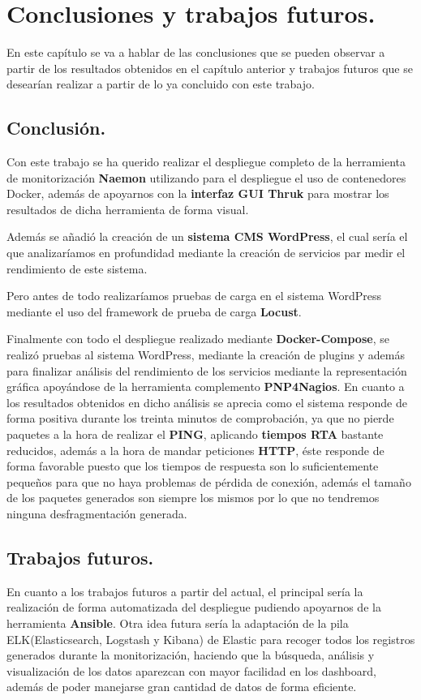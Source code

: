 \chapter{Conclusiones y trabajos futuros.} \label{ch:conclusion}

En este capítulo se va a hablar de las conclusiones que se pueden observar a partir de los resultados obtenidos en el capítulo anterior y trabajos futuros que se desearían realizar a partir de lo ya concluido con este trabajo.
\section{Conclusión.} \label{sec:resultado_final.}
Con este trabajo se ha querido realizar el despliegue completo de la herramienta de monitorización \textbf{Naemon} utilizando para el despliegue el uso de contenedores Docker, además de apoyarnos con la \textbf{interfaz GUI Thruk} para mostrar los resultados de dicha herramienta de forma visual.

Además se añadió la creación de un \textbf{sistema CMS WordPress}, el cual sería el que analizaríamos en profundidad mediante la creación de servicios par medir el rendimiento de este sistema.

Pero antes de todo realizaríamos pruebas de carga en el sistema WordPress mediante el uso del framework de prueba de carga \textbf{Locust}.

Finalmente con todo el despliegue realizado mediante \textbf{Docker-Compose}, se realizó pruebas al sistema WordPress, mediante la creación de plugins y además para finalizar análisis del rendimiento de los servicios mediante la representación gráfica apoyándose de la herramienta complemento \textbf{PNP4Nagios}.
\newpage
En cuanto a los resultados obtenidos en dicho análisis se aprecia como el sistema responde de forma positiva durante los treinta minutos de comprobación, ya que no pierde paquetes a la hora de realizar el \textbf{PING}, aplicando \textbf{tiempos RTA} bastante reducidos, además a la hora de mandar peticiones \textbf{HTTP}, éste responde de forma favorable puesto que los tiempos de respuesta son lo suficientemente pequeños para que no haya problemas de pérdida de conexión, además el tamaño de los paquetes generados son siempre los mismos por lo que no tendremos ninguna desfragmentación generada.

\section{Trabajos futuros.} \label{sec:trabajos_futuros.}

En cuanto a los trabajos futuros a partir del actual, el principal sería la realización de forma automatizada del despliegue pudiendo apoyarnos de la herramienta \textbf{Ansible}.
Otra idea futura sería la adaptación de la pila ELK(Elasticsearch, Logstash y Kibana) de Elastic para recoger todos los registros generados durante la monitorización, haciendo que la búsqueda, análisis y visualización de los datos aparezcan con mayor facilidad en los dashboard, además de poder manejarse gran cantidad de datos de forma eficiente.
\newpage